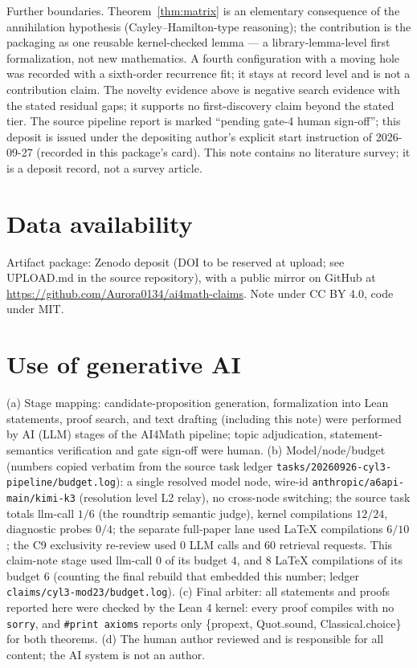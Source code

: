 \documentclass[11pt]{article}
\begin{document}
Further boundaries. Theorem~\ref{thm:matrix} is an elementary consequence
of the annihilation hypothesis (Cayley--Hamilton-type reasoning); the
contribution is the packaging as one reusable kernel-checked lemma ---
a library-lemma-level first formalization, not new mathematics. A fourth
configuration with a moving hole was recorded with a sixth-order recurrence
fit; it stays at record level and is not a contribution claim. The novelty
evidence above is negative search evidence with the stated residual gaps;
it supports no first-discovery claim beyond the stated tier. The source
pipeline report is marked ``pending gate-4 human sign-off''; this deposit
is issued under the depositing author's explicit start instruction of
2026-09-27 (recorded in this package's card). This note contains no
literature survey; it is a deposit record, not a survey article.

\section*{Data availability}

Artifact package: Zenodo deposit (DOI to be reserved at upload; see
UPLOAD.md in the source repository), with a public mirror on GitHub at
\url{https://github.com/Aurora0134/ai4math-claims}. Note under CC BY 4.0,
code under MIT.

\section*{Use of generative AI}

(a) Stage mapping: candidate-proposition generation, formalization into
Lean statements, proof search, and text drafting (including this note) were
performed by AI (LLM) stages of the AI4Math pipeline; topic adjudication,
statement-semantics verification and gate sign-off were human. (b)
Model/node/budget (numbers copied verbatim from the source task ledger
\texttt{tasks/20260926-cyl3-pipeline/budget.log}): a single resolved model
node, wire-id \texttt{anthropic/a6api-main/kimi-k3} (resolution level L2
relay), no cross-node switching; the source task totals llm-call $1/6$ (the
roundtrip semantic judge), kernel compilations $12/24$, diagnostic probes
$0/4$; the separate full-paper lane used LaTeX compilations $6/10$; the C9
exclusivity re-review used 0 LLM calls and 60 retrieval requests. This
claim-note stage used llm-call $0$ of its budget $4$, and $8$ LaTeX
compilations of its budget $6$ (counting the final rebuild that embedded
this number; ledger \texttt{claims/cyl3-mod23/budget.log}). (c) Final
arbiter: all statements and proofs reported here were checked by the Lean 4
kernel: every proof compiles with no \texttt{sorry}, and \texttt{\#print
axioms} reports only \{propext, Quot.sound, Classical.choice\} for both
theorems. (d) The human author reviewed and is responsible for all content;
the AI system is not an author.
\end{document}
